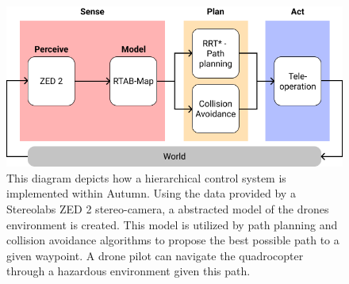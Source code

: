 \begin{figure}
	\centering
	\includegraphics[width=0.9\linewidth]{img/AutumnControlCycle}
	\caption{
		This diagram depicts how a hierarchical control system is implemented within Autumn. Using the data provided by a Stereolabs ZED 2 stereo-camera, a abstracted model of the drones environment is created. This model is utilized by path planning and collision avoidance algorithms to propose the best possible path to a given waypoint. A drone pilot can navigate the quadrocopter through a hazardous environment given this path. 
	}
	\label{fig:autumnControlLoop}
\end{figure}


\filbreak